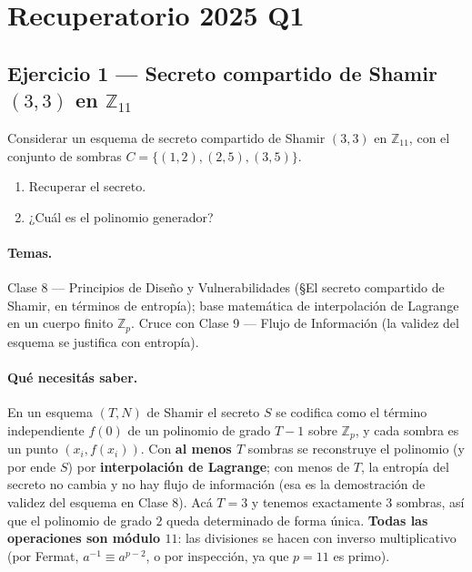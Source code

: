 \section{Recuperatorio 2025 Q1}


\subsection{Ejercicio 1 — Secreto compartido de Shamir $(3,3)$ en $\mathbb{Z}_{11}$}

\begin{consigna}
Considerar un esquema de secreto compartido de Shamir $(3,3)$ en $\mathbb{Z}_{11}$, con el
conjunto de sombras $C = \{(1,2),(2,5),(3,5)\}$.
\begin{enumerate}
  \item[a)] Recuperar el secreto.
  \item[b)] ¿Cuál es el polinomio generador?
\end{enumerate}
\end{consigna}

\paragraph{Temas.}
Clase 8 — Principios de Diseño y Vulnerabilidades (\S El secreto compartido de Shamir, en
términos de entropía); base matemática de interpolación de Lagrange en un cuerpo finito
$\mathbb{Z}_p$. Cruce con Clase 9 — Flujo de Información (la validez del esquema se justifica
con entropía).

\paragraph{Qué necesitás saber.}
En un esquema $(T,N)$ de Shamir el secreto $S$ se codifica como el término independiente
$f(0)$ de un polinomio de grado $T-1$ sobre $\mathbb{Z}_p$, y cada sombra es un punto
$(x_i, f(x_i))$. Con \textbf{al menos $T$} sombras se reconstruye el polinomio (y por ende
$S$) por \textbf{interpolación de Lagrange}; con menos de $T$, la entropía del secreto no
cambia y no hay flujo de información (esa es la demostración de validez del esquema en
Clase 8). Acá $T=3$ y tenemos exactamente $3$ sombras, así que el polinomio de grado $2$
queda determinado de forma única. \textbf{Todas las operaciones son módulo $11$}: las
divisiones se hacen con inverso multiplicativo (por Fermat, $a^{-1}\equiv a^{p-2}$, o por
inspección, ya que $p=11$ es primo).

